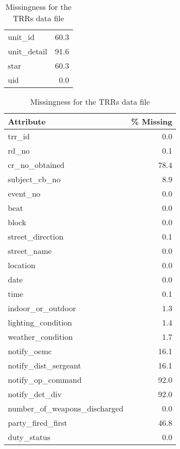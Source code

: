 \begin{table}
\begin{minipage}[t]{0.48\textwidth}
\begin{tabular}{lr}
             unit\_id &       60.3 \\
         unit\_detail &       91.6 \\
                star &       60.3 \\
                 uid &        0.0 \\
\bottomrule
\end{tabular}
\end{minipage}\hfill
\begin{minipage}[t]{0.48\textwidth}
\caption{Missingness for the TRRs data file}
\centering 
\begin{tabular}{lr}
\toprule
                   Attribute &  \% Missing \\
\midrule
                      trr\_id &        0.0 \\
                       rd\_no &        0.1 \\
              cr\_no\_obtained &       78.4 \\
               subject\_cb\_no &        8.9 \\
                    event\_no &        0.0 \\
                        beat &        0.0 \\
                       block &        0.0 \\
            street\_direction &        0.1 \\
                 street\_name &        0.0 \\
                    location &        0.0 \\
                        date &        0.0 \\
                        time &        0.1 \\
           indoor\_or\_outdoor &        1.3 \\
          lighting\_condition &        1.4 \\
           weather\_condition &        1.7 \\
                 notify\_oemc &       16.1 \\
        notify\_dist\_sergeant &       16.1 \\
           notify\_op\_command &       92.0 \\
              notify\_det\_div &       92.0 \\
number\_of\_weapons\_discharged &        0.0 \\
           party\_fired\_first &       46.8 \\
                 duty\_status &        0.0 \\

\end{tabular}
\end{minipage}
\end{table}
